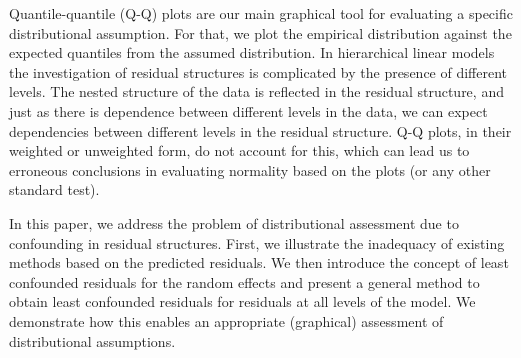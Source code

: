 \documentclass{article} %
\newcommand{\al}[1]{{\color{red} #1}}
\begin{document}
Quantile-quantile (Q-Q) plots \citep{Wilk:1968} are our main graphical tool for evaluating a specific distributional assumption. For that, we plot the empirical distribution against \al{the} expected quantiles \al{from the assumed distribution}. In hierarchical \al{linear} models the investigation of residual structures is complicated by the presence of  different levels. 
The nested structure of the data is reflected in the residual structure, and just as there is dependence between different levels in the data, we can expect dependencies between different levels in the residual structure. Q-Q plots, \al{in their} weighted \citep{Dempster:1985tr, Lange:1989uu} or unweighted \al{form}, do not account for this, which can lead us to erroneous conclusions in evaluating normality based on the plots (or any other \al{standard} test).



In this paper, we address the problem of distributional assessment due to confounding in residual structures. 
First, we illustrate the inadequacy of existing methods  based on the predicted residuals. 
We then introduce  the concept of least confounded  residuals for the random effects and present a general method to obtain least confounded residuals for residuals at all levels of the model. We demonstrate how this enables an appropriate (graphical) assessment  of distributional assumptions.
\end{document}

